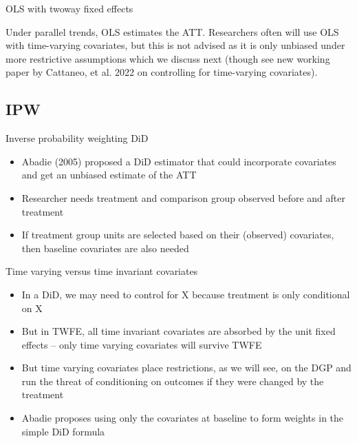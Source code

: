 \documentclass{beamer}
\begin{document}
\begin{frame}{OLS with twoway fixed effects}


Under parallel trends, OLS estimates the ATT. Researchers often will use OLS with time-varying covariates, but this is not advised as it is only unbiased under more restrictive assumptions which we discuss next (though see new working paper by Cattaneo, et al. 2022 on controlling for time-varying covariates).



\end{frame}


\subsection{IPW}




\begin{frame}{Inverse probability weighting DiD}

\begin{itemize}
\item Abadie (2005) proposed a DiD estimator that could incorporate covariates and get an unbiased estimate of the ATT
\item Researcher needs treatment and comparison group observed before and after treatment
\item If treatment group units are selected based on their (observed) covariates, then baseline covariates are also needed 
\end{itemize}

\end{frame}


\begin{frame}{Time varying versus time invariant covariates}

\begin{itemize}
\item In a DiD, we may need to control for X because treatment is only conditional on X
\item But in TWFE, all time invariant covariates are absorbed by the unit fixed effects -- only time varying covariates will survive TWFE
\item But time varying covariates place restrictions, as we will see, on the DGP and run the threat of conditioning on outcomes if they were changed by the treatment
\item Abadie proposes using only the covariates at baseline to form weights in the simple DiD formula
\end{itemize}

\end{frame}
\end{document}
